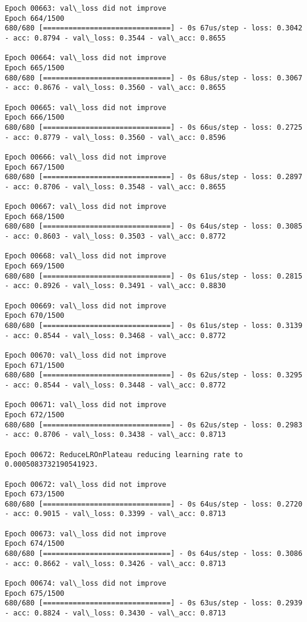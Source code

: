 \documentclass[11pt]{article}
\begin{document}
\begin{Verbatim}[commandchars=\\\{\}]
Epoch 00663: val\_loss did not improve
Epoch 664/1500
680/680 [==============================] - 0s 67us/step - loss: 0.3042 - acc: 0.8794 - val\_loss: 0.3544 - val\_acc: 0.8655

Epoch 00664: val\_loss did not improve
Epoch 665/1500
680/680 [==============================] - 0s 68us/step - loss: 0.3067 - acc: 0.8676 - val\_loss: 0.3560 - val\_acc: 0.8655

Epoch 00665: val\_loss did not improve
Epoch 666/1500
680/680 [==============================] - 0s 66us/step - loss: 0.2725 - acc: 0.8779 - val\_loss: 0.3560 - val\_acc: 0.8596

Epoch 00666: val\_loss did not improve
Epoch 667/1500
680/680 [==============================] - 0s 68us/step - loss: 0.2897 - acc: 0.8706 - val\_loss: 0.3548 - val\_acc: 0.8655

Epoch 00667: val\_loss did not improve
Epoch 668/1500
680/680 [==============================] - 0s 64us/step - loss: 0.3085 - acc: 0.8603 - val\_loss: 0.3503 - val\_acc: 0.8772

Epoch 00668: val\_loss did not improve
Epoch 669/1500
680/680 [==============================] - 0s 61us/step - loss: 0.2815 - acc: 0.8926 - val\_loss: 0.3491 - val\_acc: 0.8830

Epoch 00669: val\_loss did not improve
Epoch 670/1500
680/680 [==============================] - 0s 61us/step - loss: 0.3139 - acc: 0.8544 - val\_loss: 0.3468 - val\_acc: 0.8772

Epoch 00670: val\_loss did not improve
Epoch 671/1500
680/680 [==============================] - 0s 62us/step - loss: 0.3295 - acc: 0.8544 - val\_loss: 0.3448 - val\_acc: 0.8772

Epoch 00671: val\_loss did not improve
Epoch 672/1500
680/680 [==============================] - 0s 62us/step - loss: 0.2983 - acc: 0.8706 - val\_loss: 0.3438 - val\_acc: 0.8713

Epoch 00672: ReduceLROnPlateau reducing learning rate to 0.0005083732190541923.

Epoch 00672: val\_loss did not improve
Epoch 673/1500
680/680 [==============================] - 0s 64us/step - loss: 0.2720 - acc: 0.9015 - val\_loss: 0.3399 - val\_acc: 0.8713

Epoch 00673: val\_loss did not improve
Epoch 674/1500
680/680 [==============================] - 0s 64us/step - loss: 0.3086 - acc: 0.8662 - val\_loss: 0.3426 - val\_acc: 0.8713

Epoch 00674: val\_loss did not improve
Epoch 675/1500
680/680 [==============================] - 0s 63us/step - loss: 0.2939 - acc: 0.8824 - val\_loss: 0.3430 - val\_acc: 0.8713


\end{Verbatim}
\end{document}

